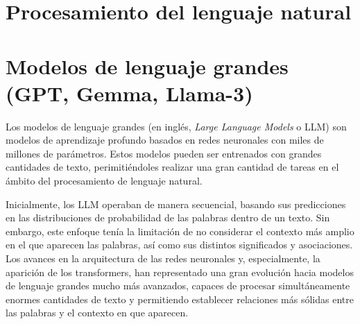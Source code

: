 \documentclass[11pt,spanish,listoffigures,listoftables]{tfgetsinf}
\begin{document}



\section{Procesamiento del lenguaje natural}

\section{Modelos de lenguaje grandes (GPT, Gemma, Llama-3)}


Los modelos de lenguaje grandes (en inglés, \textit{Large Language Models} o LLM) son modelos de aprendizaje profundo basados en redes neuronales con miles de millones de parámetros. Estos modelos pueden ser entrenados con grandes cantidades de texto, perimitiéndoles realizar una gran cantidad de tareas en el ámbito del procesamiento de lenguaje natural.

Inicialmente, los LLM operaban de manera secuencial, basando sus predicciones en las distribuciones de probabilidad de las palabras dentro de un texto. Sin embargo, este enfoque tenía la limitación de no considerar el contexto más amplio en el que aparecen las palabras, así como sus distintos significados y asociaciones. Los  avances en la arquitectura de las redes neuronales y, especialmente, la aparición de los transformers, han representado una gran evolución hacia modelos de lenguaje grandes mucho más avanzados, capaces de procesar simultáneamente enormes cantidades de texto y permitiendo establecer relaciones más sólidas entre las palabras y el contexto en que aparecen.
\end{document}
